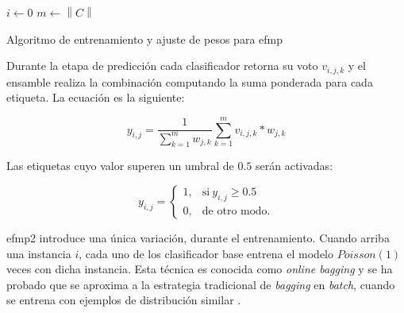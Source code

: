 \begin{center}
	\begin{algorithm}[H]
		\label{alg:entrenamiento_efmp}
		\SetAlgoLined
		\DontPrintSemicolon
		$i \gets 0$ \;
		$m \gets \left\|C\right\|$ \;
		\caption{Algoritmo de entrenamiento y ajuste de pesos para \acrfull{efmp}}
	\end{algorithm}
\end{center}

Durante la etapa de predicción cada clasificador retorna su voto $v_{i,j,k}$ y
el ensamble realiza la combinación computando la suma ponderada para cada
etiqueta. La ecuación es la siguiente:

\begin{equation}
	y_{i,j} = \frac{1}{\sum_{k=1}^{m} w_{j,k}} \sum_{k=1}^{m} v_{i,j,k} *
	w_{j,k}
\end{equation}

Las etiquetas cuyo valor superen un umbral de $0.5$ serán activadas:

\begin{equation}
	y_{i,j} =
	\begin{cases}
		1, & \text{si}\ y_{i,j} \geq 0.5 \\
		0, & \text{de otro modo.}
	\end{cases}
\end{equation}

\acrshort{efmp2} introduce una única variación, durante el entrenamiento. Cuando
arriba una instancia $i$, cada uno de los clasificador base entrena el modelo
$Poisson(1)$ veces con dicha instancia. Esta técnica es conocida como
\textit{online bagging} y se ha probado que se aproxima a la estrategia
tradicional de \textit{bagging} en \textit{batch}, cuando se entrena con
ejemplos de distribución similar \cite{oza_online_2005}.


